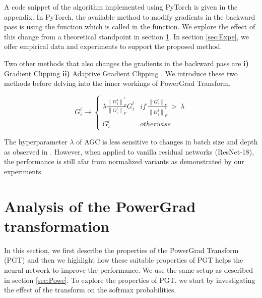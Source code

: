 \documentclass[times,sort&compress]{elsarticle}
\newcommand{\norm}[1]{\left\lVert#1\right\rVert}
\begin{document}
A code snippet of the algorithm implemented using PyTorch \cite{NEURIPS2019_9015} is
given in the appendix. In PyTorch, the available method to modify gradients in the
backward pass is using the  function which is called in the
 function. We explore the effect of this change from a theoretical
standpoint in section \ref{sec:Math}. In section \ref{sec:Expe}, we offer empirical data
and experiments to support the proposed method.





Two other methods that also changes the gradients in the backward pass are \textbf{i)}
Gradient Clipping \cite{pascanu2013difficulty} \textbf{ii)} Adaptive Gradient Clipping
\cite{brock2021high}. We introduce these two methods before delving into the inner
workings of PowerGrad Transform.





\begin{equation}
G_{i}^{l}\rightarrow
\begin{cases}
\lambda \frac{\norm{W_{i}^{l} }_{F}^{*}}{\norm{G_{i}^{l} }_{F}} G_{i}^{l} & if\ \frac{\norm{G_{i}^{l} }_{F}}{\norm{W_{i}^{l} }_{F}^{*}} \  >\ \lambda \\
G_{i}^{l} & otherwise
\end{cases}
\end{equation}



The hyperparameter $\lambda$ of AGC is less sensitive to changes in batch size and depth
as observed in \cite{brock2021high}. However, when applied to vanilla residual networks
(ResNet-18), the performance is still afar from normalized variants as demonstrated by
our experiments.








\section{Analysis of the PowerGrad transformation}
\label{sec:Math}

In this section, we first describe the properties of the  PowerGrad Transform (PGT) and
then we highlight how these suitable properties of PGT helps the neural network to
improve the performance. We use the same setup as described in section \ref{sec:Powe}.
To explore the properties of PGT, we start by investigating the effect of the transform
on the softmax probabilities.
\end{document}
